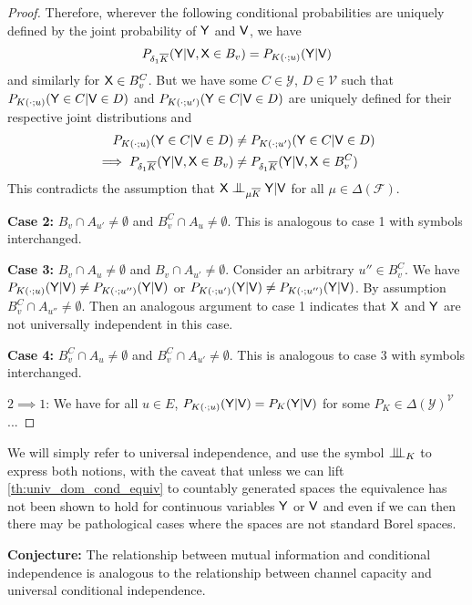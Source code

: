 \begin{proof}
Therefore, wherever the following conditional probabilities are uniquely defined by the joint probability of $\mathsf{Y}$ and $\mathsf{V}$, we have
\begin{align}
    P_{\delta_1\overline{K}}(\mathsf{Y}|\mathsf{V},\mathsf{X}\in B_v) &= P_{K(\cdot;u)}(\mathsf{Y}|\mathsf{V})\\
\end{align}
and similarly for $\mathsf{X}\in B_v^C$. But we have some $C\in \mathcal{Y}$, $D\in \mathcal{V}$ such that $P_{K(\cdot;u)}(\mathsf{Y}\in C|\mathsf{V}\in D)$ and $P_{K(\cdot;u')}(\mathsf{Y}\in C|\mathsf{V}\in D)$ are uniquely defined for their respective joint distributions and
\begin{align}
    P_{K(\cdot;u)}(\mathsf{Y}\in C|\mathsf{V}\in D)&\neq P_{K(\cdot;u')}(\mathsf{Y}\in C|\mathsf{V}\in D)\\
    \implies P_{\delta_1\overline{K}}(\mathsf{Y}|\mathsf{V},\mathsf{X}\in B_v) &\neq  P_{\delta_1\overline{K}}(\mathsf{Y}|\mathsf{V},\mathsf{X}\in B^C_v)
\end{align}
This contradicts the assumption that $\RV{X}\CI_{\mu\overline{K}} \RV{Y}|\RV{V}$ for all $\mu\in\Delta(\mathcal{F})$.

\textbf{Case 2:} $B_v\cap A_{u'}\neq \emptyset$ and $B_v^C \cap A_{u}\neq \emptyset$. This is analogous to case 1 with symbols interchanged.

\textbf{Case 3:} $B_v\cap A_u\neq \emptyset$ and $B_v \cap A_{u'}\neq \emptyset$. Consider an arbitrary $u''\in B_v^C$. We have $P_{K(\cdot;u)}(\mathsf{Y}|\mathsf{V})\neq P_{K(\cdot;u'')}(\mathsf{Y}|\mathsf{V})$ or $P_{K(\cdot;u')}(\mathsf{Y}|\mathsf{V})\neq P_{K(\cdot;u'')}(\mathsf{Y}|\mathsf{V})$. By assumption $B_v^C\cap A_{u''}\neq \emptyset$. Then an analogous argument to case 1 indicates that $\mathsf{X}$ and $\mathsf{Y}$ are not universally independent in this case.

\textbf{Case 4:} $B^C_v\cap A_u\neq \emptyset$ and $B^C_v \cap A_{u'}\neq \emptyset$. This is analogous to case 3 with symbols interchanged.

$2\implies 1$:
We have for all $u\in E$, $P_{K(\cdot;u)}(\mathsf{Y}|\mathsf{V})=P_K(\mathsf{Y}|\mathsf{V})$ for some $P_K\in \Delta(\mathcal{Y})^{\mathcal{V}}$...

\end{proof}

We will simply refer to universal independence, and use the symbol $\CII_K$ to express both notions, with the caveat that unless we can lift \ref{th:univ_dom_cond_equiv} to countably generated spaces the equivalence has not been shown to hold for continuous variables $\mathsf{Y}$ or $\mathsf{V}$ and even if we can then there may be pathological cases where the spaces are not standard Borel spaces.

\textbf{Conjecture:} The relationship between mutual information and conditional independence is analogous to the relationship between channel capacity and universal conditional independence.